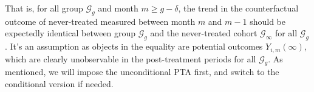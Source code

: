That is, for all group $\mathcal{G}_g$ and month $m \geq g-\delta$, the trend in the counterfactual outcome of never-treated measured between month $m$ and $m-1$ should be expectedly identical between group $\mathcal{G}_g$ and the never-treated cohort $\mathcal{G}_{\infty}$ for all $\mathcal{G}_g$.
It's an assumption as objects in the equality are potential outcomes $Y_{i, m}(\infty)$, which are clearly unobservable in the post-treatment periods for all $\mathcal{G}_g$. As mentioned, we will impose the unconditional PTA first, and switch to the conditional version if needed.


